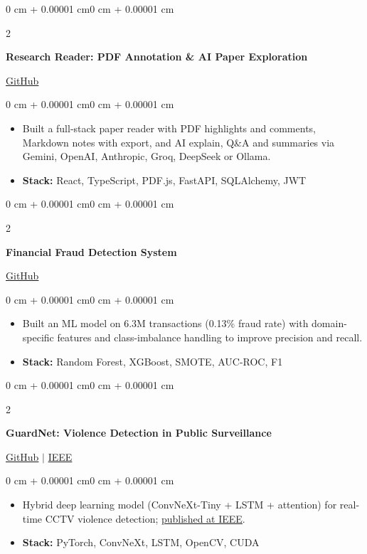 \documentclass[10pt, letterpaper]{article}
\newenvironment{highlights}{
    \begin{itemize}[
        topsep=0.03 cm,
        parsep=0.03 cm,
        partopsep=0pt,
        itemsep=0pt,
        leftmargin=0 cm + 10pt
    ]
}{
    \end{itemize}
}
\newenvironment{onecolentry}{
    \begin{adjustwidth}{0 cm + 0.00001 cm}{0 cm + 0.00001 cm}
}{
    \end{adjustwidth}
}
\newenvironment{twocolentry}[2][]{
    \onecolentry
    \def\secondColumn{#2}
    \setcolumnwidth{\fill, 4.5 cm}
    \begin{paracol}{2}
}{
    \switchcolumn \raggedleft \secondColumn
    \end{paracol}
    \endonecolentry
}
\begin{document}
        \begin{twocolentry}{\href{https://github.com/romit-23/research-reader}{GitHub}}
            \textbf{Research Reader: PDF Annotation \& AI Paper Exploration}
        \end{twocolentry}
        \vspace{0.03 cm}
        \begin{onecolentry}
            \begin{highlights}
                \item Built a full-stack paper reader with PDF highlights and comments, Markdown notes with export, and AI explain, Q\&A and summaries via Gemini, OpenAI, Anthropic, Groq, DeepSeek or Ollama.
                \item \textbf{Stack:} React, TypeScript, PDF.js, FastAPI, SQLAlchemy, JWT
            \end{highlights}
        \end{onecolentry}

        \vspace{0.06 cm}

        \begin{twocolentry}{\href{https://github.com/romit-23/Fraud-Detection-Model}{GitHub}}
            \textbf{Financial Fraud Detection System}
        \end{twocolentry}
        \vspace{0.03 cm}
        \begin{onecolentry}
            \begin{highlights}
                \item Built an ML model on 6.3M transactions (0.13\% fraud rate) with domain-specific features and class-imbalance handling to improve precision and recall.
                \item \textbf{Stack:} Random Forest, XGBoost, SMOTE, AUC-ROC, F1
            \end{highlights}
        \end{onecolentry}

        \vspace{0.06 cm}

        \begin{twocolentry}{\href{https://github.com/romit-23/GuardNet}{GitHub} $|$ \href{https://ieeexplore.ieee.org/document/11284226}{IEEE}}
            \textbf{GuardNet: Violence Detection in Public Surveillance}
        \end{twocolentry}
        \vspace{0.03 cm}
        \begin{onecolentry}
            \begin{highlights}
                \item Hybrid deep learning model (ConvNeXt-Tiny + LSTM + attention) for real-time CCTV violence detection; \href{https://ieeexplore.ieee.org/document/11284226}{published at IEEE}.
                \item \textbf{Stack:} PyTorch, ConvNeXt, LSTM, OpenCV, CUDA
            \end{highlights}
        \end{onecolentry}
\end{document}
